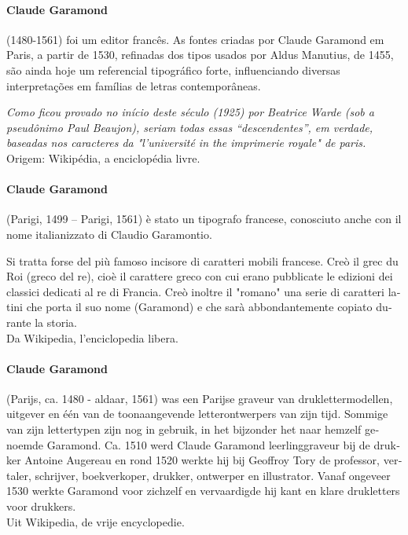 \documentclass[pagesize,DIV14]{scrartcl}
\begin{document}
\begin{multicols}{2}
\begin{portuges}
\paragraph*{Claude Garamond} (1480-1561) foi um editor francês. As fontes criadas por Claude Garamond em Paris, a partir de 1530, refinadas dos tipos usados por Aldus Manutius, de 1455, são ainda hoje um referencial tipográfico forte, influenciando diversas interpretações em famílias de letras contemporâneas.

\textit{Como ficou provado no início deste século (1925) por Beatrice Warde (sob a pseudônimo Paul Beaujon), seriam todas essas “descendentes”, em verdade, baseadas nos caracteres da "l’université in the imprimerie royale" de paris.}\\
{\scriptsize Origem: Wikipédia, a enciclopédia livre.}
\end{portuges}

\begin{italian}
\paragraph*{Claude Garamond} (Parigi, 1499 – Parigi, 1561) è stato un tipografo francese, conosciuto anche con il nome italianizzato di Claudio Garamontio.

Si tratta forse del più famoso incisore di caratteri mobili francese. Creò il grec du Roi (greco del re), cioè il carattere greco con cui erano pubblicate le edizioni dei classici dedicati al re di Francia. Creò inoltre il "romano" una serie di caratteri latini che porta il suo nome (Garamond) e che sarà abbondantemente copiato durante la storia.\\
{\scriptsize Da Wikipedia, l'enciclopedia libera.}
\end{italian}

\begin{dutch}
\paragraph*{Claude Garamond} (Parijs, ca. 1480 - aldaar, 1561) was een Parijse graveur van druklettermodellen, uitgever en één van de toonaangevende letterontwerpers van zijn tijd. Sommige van zijn lettertypen zijn nog in gebruik, in het bijzonder het naar hemzelf genoemde Garamond. Ca. 1510 werd Claude Garamond leerlinggraveur bij de drukker Antoine Augereau en rond 1520 werkte hij bij Geoffroy Tory de professor, vertaler, schrijver, boekverkoper, drukker, ontwerper en illustrator. Vanaf ongeveer 1530 werkte Garamond voor zichzelf en vervaardigde hij kant en klare drukletters voor drukkers.\\
{\scriptsize Uit Wikipedia, de vrije encyclopedie.}
\end{dutch}


\end{multicols}
\end{document}
